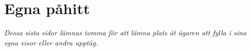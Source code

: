 
\section{Egna påhitt}

\pagestyle{Egna påhitt}



\emph{Dessa sista sidor lämnas tomma för att lämna plats åt ägaren att fylla i sina egna visor eller andra upptåg.}

\newpage
\phantom{1}
\newpage
\phantom{1}
\newpage
\phantom{1}
\newpage
\phantom{1}
\newpage
\phantom{1}
\newpage
\phantom{1}
\newpage
\phantom{1}
\newpage